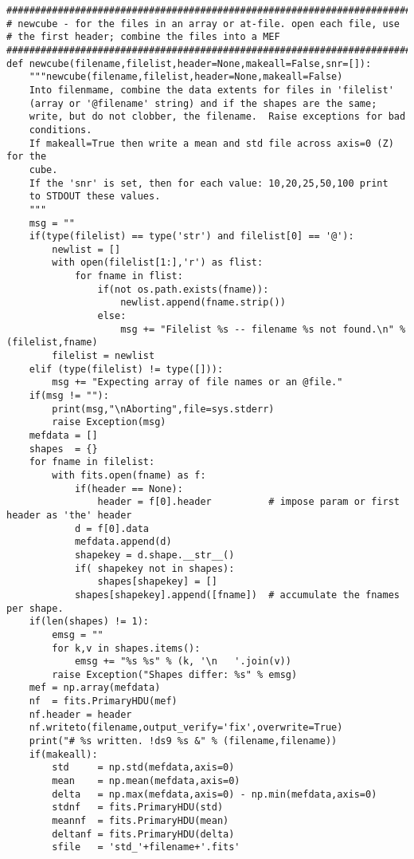 {\begin{verbatim}
#############################################################################
# newcube - for the files in an array or at-file. open each file, use
# the first header; combine the files into a MEF
#############################################################################
def newcube(filename,filelist,header=None,makeall=False,snr=[]):
    """newcube(filename,filelist,header=None,makeall=False)
    Into filenmame, combine the data extents for files in 'filelist'
    (array or '@filename' string) and if the shapes are the same;
    write, but do not clobber, the filename.  Raise exceptions for bad
    conditions.
    If makeall=True then write a mean and std file across axis=0 (Z) for the
    cube.
    If the 'snr' is set, then for each value: 10,20,25,50,100 print
    to STDOUT these values.
    """
    msg = ""
    if(type(filelist) == type('str') and filelist[0] == '@'):
        newlist = []
        with open(filelist[1:],'r') as flist:
            for fname in flist:
                if(not os.path.exists(fname)):
                    newlist.append(fname.strip())
                else:
                    msg += "Filelist %s -- filename %s not found.\n" % (filelist,fname)
        filelist = newlist
    elif (type(filelist) != type([])):
        msg += "Expecting array of file names or an @file."
    if(msg != ""):
        print(msg,"\nAborting",file=sys.stderr)
        raise Exception(msg)
    mefdata = []
    shapes  = {}
    for fname in filelist:
        with fits.open(fname) as f:
            if(header == None):
                header = f[0].header          # impose param or first header as 'the' header
            d = f[0].data
            mefdata.append(d)
            shapekey = d.shape.__str__()
            if( shapekey not in shapes):
                shapes[shapekey] = []
            shapes[shapekey].append([fname])  # accumulate the fnames per shape.
    if(len(shapes) != 1):
        emsg = ""
        for k,v in shapes.items():
            emsg += "%s %s" % (k, '\n   '.join(v))
        raise Exception("Shapes differ: %s" % emsg)
    mef = np.array(mefdata)
    nf  = fits.PrimaryHDU(mef)
    nf.header = header
    nf.writeto(filename,output_verify='fix',overwrite=True)
    print("# %s written. !ds9 %s &" % (filename,filename))
    if(makeall):
        std     = np.std(mefdata,axis=0)
        mean    = np.mean(mefdata,axis=0)
        delta   = np.max(mefdata,axis=0) - np.min(mefdata,axis=0)
        stdnf   = fits.PrimaryHDU(std)
        meannf  = fits.PrimaryHDU(mean)
        deltanf = fits.PrimaryHDU(delta)
        sfile   = 'std_'+filename+'.fits'

\end{verbatim}}
